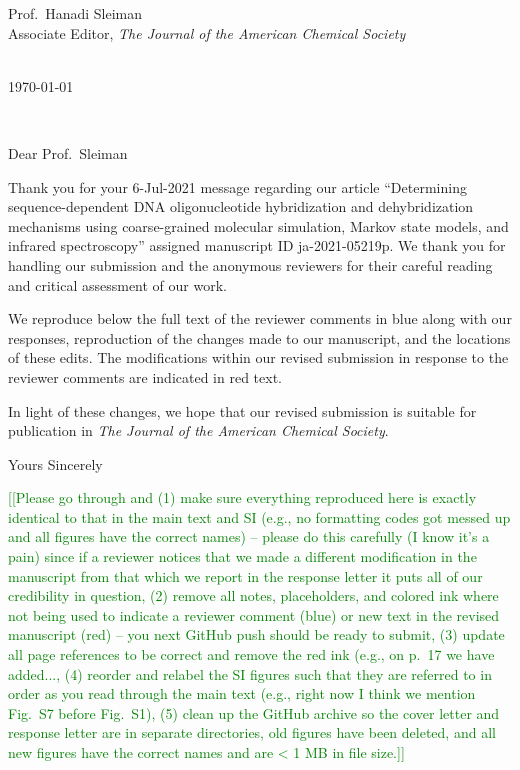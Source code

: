 \documentclass[11pt,a4paper]{letter} %
\makeatletter
\newcommand*{\noteg}[1]{\textcolor{green}{[[#1]]}}		%
\def\opening#1{\thispagestyle{empty}
{\centering\fromaddress \vspace{1.1in} \\ %
%
\hspace*{4.15 in}\today\hspace*{\fill}\par
} %
{\raggedright \toname \\ \toaddress \par} %
\vspace{0.05in} %
\noindent #1 %
}
\makeatother
\begin{document}

\begin{letter}
{
Prof.\ Hanadi Sleiman \\
Associate Editor, \textit{The Journal of the American Chemical Society}
}


\opening{Dear Prof.\ Sleiman}

Thank you for your 6-Jul-2021 message regarding our article ``Determining sequence-dependent DNA oligonucleotide hybridization and dehybridization mechanisms using coarse-grained molecular simulation, Markov state models, and infrared spectroscopy'' assigned manuscript ID ja-2021-05219p. We thank you for handling our submission and the anonymous reviewers for their careful reading and critical assessment of our work.

We reproduce below the full text of the reviewer comments in blue along with our responses, reproduction of the changes made to our manuscript, and the locations of these edits. The modifications within our revised submission in response to the reviewer comments are indicated in red text. 

In light of these changes, we hope that our revised submission is suitable for publication in \textit{The Journal of the American Chemical Society}.

\closing{Yours Sincerely}

\end{letter}


\clearpage
\newpage

\noteg{Please go through and (1) make sure everything reproduced here is exactly identical to that in the main text and SI (e.g., no formatting codes got messed up and all figures have the correct names) -- please do this carefully (I know it's a pain) since if a reviewer notices that we made a different modification in the manuscript from that which we report in the response letter it puts all of our credibility in question, (2) remove all notes, placeholders, and colored ink where not being used to indicate a reviewer comment (blue) or new text in the revised manuscript (red) -- you next GitHub push should be ready to submit, (3) update all page references to be correct and remove the red ink (e.g., on p.~17 we have added..., (4) reorder and relabel the SI figures such that they are referred to in order as you read through the main text (e.g., right now I think we mention Fig.~S7 before Fig.~S1), (5) clean up the GitHub archive so the cover letter and response letter are in separate directories, old figures have been deleted, and all new figures have the correct names and are < 1 MB in file size.}
\end{document}
